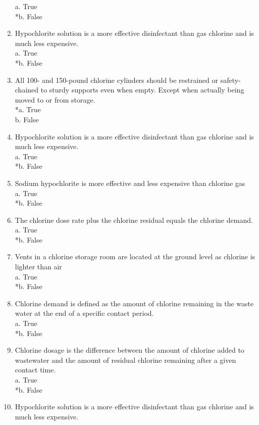 \begin{enumerate}
a. True \\
*b. False \\
\item Hypochlorite solution is a more effective disinfectant than gas chlorine and is much less expensive. \\
a. True \\
*b. False \\
\item All 100- and 150-pound chlorine cylinders should be restrained or safety-chained to sturdy supports even when empty. Except when actually being moved to or from storage. \\
*a. True \\
b. False \\
\item Hypochlorite solution is a more effective disinfectant than gas chlorine and is much less expensive. \\
a. True \\
*b. False \\
\item Sodium hypochlorite is more effective and less expensive than chlorine gas \\
a. True \\
*b. False \\
\item The chlorine dose rate plus the chlorine residual equals the chlorine demand. \\
a. True \\
*b. False \\
\item Vents in a chlorine storage room are located at the ground level as chlorine is lighter than air \\
a. True \\
*b. False \\
\item Chlorine demand is defined as the amount of chlorine remaining in the waste water at the end of a specific contact period.\\
a. True \\
*b. False \\
\item Chlorine dosage is the difference between the amount of chlorine added to wastewater and the amount of residual chlorine remaining after a given contact time.\\
a. True \\
*b. False \\
\item Hypochlorite solution is a more effective disinfectant than gas chlorine and is much less expensive.\\

\end{enumerate}
